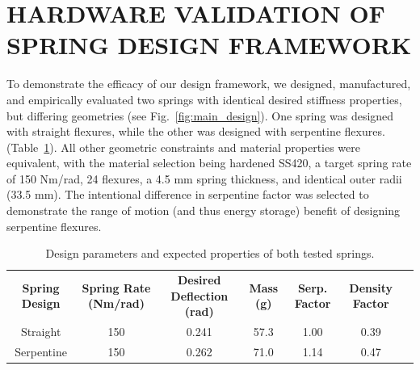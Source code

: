 \documentclass[letterpaper, 10 pt, conference]{ieeeconf} %
\begin{document}
\section{HARDWARE VALIDATION OF SPRING DESIGN FRAMEWORK}
To demonstrate the efficacy of our design framework, we designed, manufactured, and empirically evaluated two springs with identical desired stiffness properties, but differing geometries (see Fig.~\ref{fig:main_design}). One spring was designed with straight flexures, while the other was designed with serpentine flexures. (Table~\ref{table:spring_params}). All other geometric constraints and material properties were equivalent, with the material selection being hardened SS420, a target spring rate of 150 Nm/rad, 24 flexures, a 4.5 mm spring thickness, and identical outer radii (33.5 mm). The intentional difference in serpentine factor was selected to demonstrate the range of motion (and thus energy storage) benefit of designing serpentine flexures.

\begin{table}[h!]
    
    \caption{Design parameters and expected properties of both tested springs.}
    \centering
    \begin{tabular}{c c c c c c c}
    \hline
    \multirow{3}{3em}{\centering\textbf{Spring Design}} & \multirow{3}{4em}{\centering\textbf{Spring Rate (Nm/rad)}} & \multirow{3}{4.5em}{\centering\textbf{Desired Deflection (rad)}} & \multirow{3}{2em}{\centering\textbf{Mass (g)}} & \multirow{3}{3em}{\centering\textbf{Serp. Factor}} & \multirow{3}{3em}{\centering\textbf{Density Factor}}\\ 
    & & & & & & \\
    & & & & & & \\
    \hline
    Straight & 150 & 0.241 & 57.3 & 1.00 & 0.39\\
    Serpentine & 150 & 0.262 & 71.0 & 1.14 & 0.47\\
    \hline
    \end{tabular}
    \label{table:spring_params}
\end{table}
\end{document}
